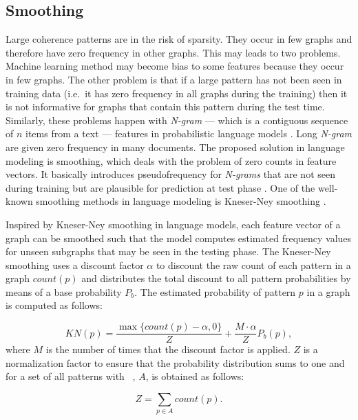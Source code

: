 \subsection{Smoothing} 
Large coherence patterns are in the risk of sparsity. 
They occur in few graphs and therefore have zero frequency in other graphs.  
This may leads to two problems. 
Machine learning method may become bias to some features because they occur in few graphs. 
The other problem is that if a large pattern has not been seen in training data (i.e.\ it has zero frequency in all graphs during the training) then it is not informative for graphs that contain this pattern during the test time. 
Similarly, these problems happen with \emph{N-gram} --- which is a contiguous sequence of $n$ items from a text --- features in probabilistic language models \cite[p.~98]{jurafsky08}. 
Long \emph{N-gram} are given zero frequency in many documents. 
The proposed solution in language modeling is smoothing, which deals with the problem of zero counts in feature vectors. 
It basically introduces pseudofrequency for \emph{N-grams} that are not seen during training but are plausible for prediction at test phase \cite[p.~99]{jurafsky08}. 
One of the \mbox{well-known} smoothing methods in language modeling is \mbox{Kneser-Ney} smoothing \cite[p.~110]{jurafsky08}. 

Inspired by \mbox{Kneser-Ney} smoothing in language models, each feature vector of a graph can be smoothed such that the model computes estimated frequency values for unseen subgraphs that may be seen in the testing phase. 
The \mbox{Kneser-Ney} smoothing uses a discount factor $\alpha$ to discount the raw count of each pattern in a graph $count(p)$ and distributes the total discount to all pattern probabilities by means of a base probability $P_b$.
The estimated probability of pattern $p$ in a graph
is computed as follows:

\begin{equation*}
KN(p) = \frac{\max \lbrace  count(p)-\alpha, 0 \rbrace }{Z} + \frac{M \cdot \alpha}{Z}P_b(p),
\end{equation*}
%
where $M$ is the number of times that the discount factor is applied. 
$Z$ is a normalization factor to ensure that the probability distribution sums to one and for a set of all patterns with \knodes\ , $A$, is obtained as follows:

\begin{equation*}
Z = \sum_{p \in A} count(p). 
\end{equation*}

